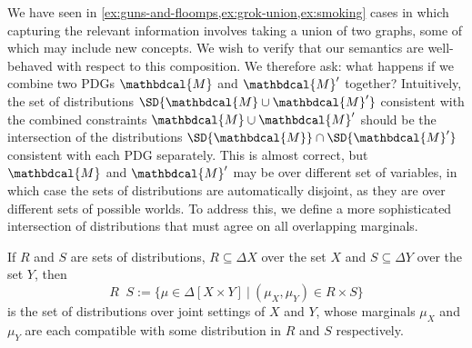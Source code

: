 \documentclass[letterpaper]{article} %
\theoremstyle{plain}
\theoremstyle{definition}
\theoremstyle{remark}
\newcommand{\notation}[2][]{#1}
\renewcommand{\notation}[2][]{{\color{notationcolor} #2}}
\DeclareMathOperator\dcap{\mathop{\dot\cap}}
\newcommand{\dg}[1]{\mathbdcal{#1}}
\begin{document}
\begin{vfull}
We have seen
	in \cref{ex:guns-and-floomps,ex:grok-union,ex:smoking} cases in
	which capturing the relevant information involves taking a
	union of two graphs, some of which may include new
	concepts. We wish to verify that our semantics are
	well-behaved with respect to this composition.	  
We therefore ask: what happens if we combine two PDGs $\dg M$
	and $\dg M'$ together? Intuitively, the set of distributions
	$\SD{\dg M \cup \dg M'}$ consistent with the combined
	constraints $\dg M\cup \dg M'$ should be the intersection of the
	distributions $\SD{\dg M} \cap \SD{\dg M'}$ consistent
	with each PDG separately. This is almost correct, but $\dg M$
	and $\dg M'$ may be over different set of variables, in which
	case the sets of distributions are automatically disjoint, as
	they are over different sets of possible worlds. To address
	this, we define a more sophisticated intersection of
	distributions that must agree on all overlapping
	marginals. %

\begin{defn}[$\dcap$]\label{def:marginal-dist-intersection}
	If $R$ and $S$ are sets of distributions, $R \subseteq \Delta X$ over the set $X$ and $S\subseteq \Delta Y$ over the set $Y$, then
		{$$R \dcap S := \Big\{ \mu \in  \Delta [X \!\times\! Y] ~\Big|~ (\mu_{X}, \mu_{Y}) \in R \times S \Big\}  $$}%
	is the set of distributions over joint settings of $X$ and $Y$, whose marginals $\mu_X$ and $\mu_Y$ are each compatible with some distribution in $R$ and $S$ respectively. 
	

\end{defn}
\end{vfull}
\end{document}
